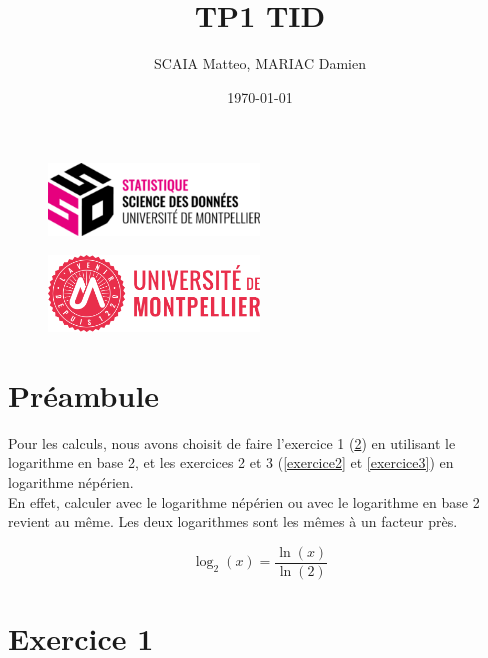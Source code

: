 \documentclass{article}
\title{TP1 TID}
\author{SCAIA Matteo, MARIAC Damien}
\date{\today}
\begin{document}
\maketitle

\begin{figure}[h] 
    \centering
    \includegraphics[width=0.5\textwidth]{ssd_logo.png} 
\end{figure}

\begin{figure}[h] 
    \centering
    \includegraphics[width=0.5\textwidth]{logo_um_2022_rouge_RVB.png} 
\end{figure}

\newpage

\tableofcontents

\newpage
\section{Préambule}
Pour les calculs, nous avons choisit de faire l'exercice 1 (\ref{Exercice1}) en utilisant le logarithme en base 2, et les exercices 2 et 3 (\ref{exercice2} et \ref{exercice3}) en logarithme népérien.\\
En effet, calculer avec le logarithme népérien ou avec le logarithme en base 2 revient au même. Les deux logarithmes sont les mêmes à un facteur près.


\[
\log_2(x) = \frac{\ln(x)}{\ln(2)}
\]


\section{Exercice 1}
\label{Exercice1}
\end{document}
